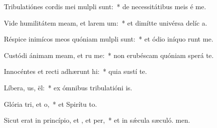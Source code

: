 \item Tribulatiónes cordis mei mulpli sunt:~* de necessitátibus meis é me.
\item Vide humilitátem meam, et larem um:~* et dimítte univérsa delíc a.
\item Réspice inimícos meos quóniam mulpli sunt:~* et ódio iníquo runt me.
\item Custódi ánimam meam, et ru me:~* non erubéscam quóniam sperá  te.
\item Innocéntes et recti adhærunt hi:~* quia sustí te.
\item Líbera, us, ël:~* ex ómnibus tribulatióni is.
\item Glória tri, et o,~* et Spirítu to.
\item Sicut erat in princípio, et , et per,~* et in sǽcula sæculó. men.

